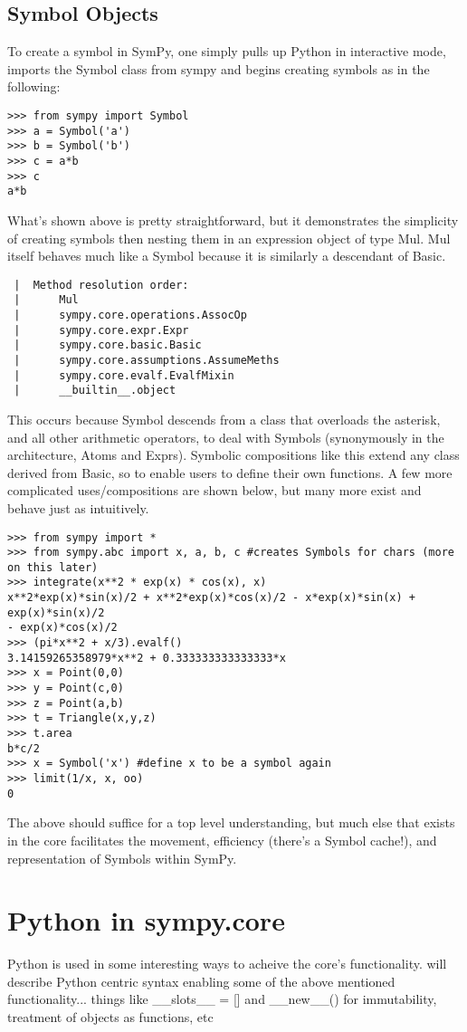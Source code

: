 \documentclass[11pt,a4paper,oneside]{report}
\begin{document}
\subsection*{\small Symbol Objects}
To create a symbol in SymPy, one simply pulls up Python in interactive mode, imports the Symbol class from sympy and begins creating symbols as in the following:
\begin{verbatim}
>>> from sympy import Symbol
>>> a = Symbol('a')
>>> b = Symbol('b')
>>> c = a*b
>>> c
a*b
\end{verbatim}
What's shown above is pretty straightforward, but it demonstrates the simplicity of creating symbols then nesting them in an expression object of type Mul. Mul itself behaves much like a Symbol because it is similarly a descendant of Basic.
\begin{verbatim}
 |  Method resolution order:
 |      Mul
 |      sympy.core.operations.AssocOp
 |      sympy.core.expr.Expr
 |      sympy.core.basic.Basic
 |      sympy.core.assumptions.AssumeMeths
 |      sympy.core.evalf.EvalfMixin
 |      __builtin__.object
\end{verbatim}
This occurs because Symbol descends from a class that overloads the asterisk, and all other arithmetic operators, to deal with Symbols (synonymously in the architecture, Atoms and Exprs). Symbolic compositions like this extend any class derived from Basic, so to enable users to define their own functions. A few more complicated uses/compositions are shown below, but many more exist and behave just as intuitively.
\begin{verbatim}
>>> from sympy import *
>>> from sympy.abc import x, a, b, c #creates Symbols for chars (more on this later)
>>> integrate(x**2 * exp(x) * cos(x), x)
x**2*exp(x)*sin(x)/2 + x**2*exp(x)*cos(x)/2 - x*exp(x)*sin(x) + exp(x)*sin(x)/2 
- exp(x)*cos(x)/2
>>> (pi*x**2 + x/3).evalf()
3.14159265358979*x**2 + 0.333333333333333*x
>>> x = Point(0,0)
>>> y = Point(c,0)
>>> z = Point(a,b)
>>> t = Triangle(x,y,z)
>>> t.area
b*c/2
>>> x = Symbol('x') #define x to be a symbol again
>>> limit(1/x, x, oo)
0
\end{verbatim}
The above should suffice for a top level understanding, but much else that exists in the core facilitates the movement, efficiency (there's a Symbol cache!), and representation of Symbols within SymPy.
\section*{Python in sympy.core}
Python is used in some interesting ways to acheive the core's functionality. 
\textasteriskcentered will describe Python centric syntax enabling some of the above mentioned functionality... things like \_\_slots\_\_ = [] and \_\_new\_\_() for immutability, treatment of objects as functions, etc\textasteriskcentered
\end{document}
